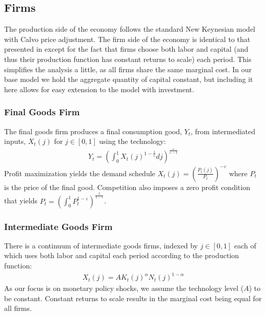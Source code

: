 \documentclass[12pt,a4paper]{article}
\begin{document}
\subsection {Firms}
The production side of the economy follows the standard New Keynesian model with Calvo price adjustment. The firm side of the economy is identical to that presented in \cite{gali_book} except for the fact that firms choose both labor and capital (and thus their production function has constant returns to scale) each period. This simplifies the analysis a little, as all firms share the same marginal cost. In our base model we hold the aggregate quantity of capital constant, but including it here allows for easy extension to the model with investment.

\subsubsection{Final Goods Firm}
The final goods firm produces a final consumption good, $Y_t$, from intermediated inputs, $X_t(j)$ for $j \in [0,1]$ using the technology:
\begin{align*}
Y_t = \left( \int_0^1 X_t(j)^{1-\frac{1}{\varepsilon}} dj \right)^{\frac{\varepsilon}{\varepsilon-1}}
\end{align*}
Profit maximization yields the demand schedule $X_t(j) = \left(\frac{P_t(j)}{P_t}\right)^{-\varepsilon}$ where $P_t$ is the price of the final good. Competition also imposes a zero profit condition that yields $P_t = \left(\int_0^1 P_t^{1-\varepsilon}\right)^{\frac{1}{1-\varepsilon}}$.

\subsubsection{Intermediate Goods Firm}
There is a continuum of intermediate goods firms, indexed by $j \in [0,1]$ each of which uses both labor and capital each period according to the production function:
\begin{align*}
X_t(j) = A K_t(j)^\alpha N_t(j)^{1-\alpha}
\end{align*}
As our focus is on monetary policy shocks, we assume the technology level ($A$) to be constant. Constant returns to scale results in the marginal cost being equal for all firms.
\end{document}
